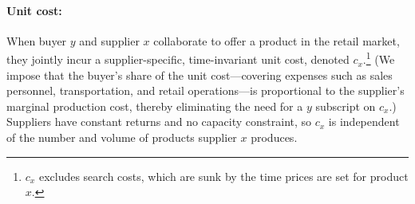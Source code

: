 \documentclass[12pt]{article} \usepackage{amsmath,amssymb,amsthm,geometry,graphicx,setspace,algorithm,algpseudocode,float}
\begin{document}
\paragraph{Unit cost:} 
\label{fn:marginalcost} 
When buyer $y$ and supplier $x$ collaborate to offer a product in the retail market, they jointly incur a supplier-specific, time-invariant unit cost, denoted $c_x$.\footnote{$c_x$ excludes search costs, which are sunk by the time prices are set for product $x$.\label{fn:unit_cost}\medskip}  (We impose that the buyer’s share of the unit cost---covering expenses such as sales personnel, transportation, and retail operations---is proportional to the supplier’s marginal production cost, thereby eliminating the need for a $y$ subscript on $c_x$.) Suppliers have constant returns and no capacity constraint, so $c_x$ is independent of the number and volume of products supplier $x$ produces. 
\end{document}
